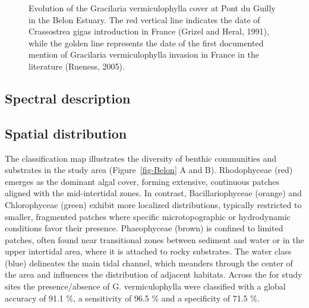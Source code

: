 \documentclass[
  letterpaper,
  DIV=11,
  numbers=noendperiod]{scrartcl}
\begin{document}
\label{cell-fig-HistoricalPlot}
\begin{figure}[H]


\caption{\label{fig-HistoricalPlot}Evolution of the Gracilaria
vermiculophylla cover at Pont du Guilly in the Belon Estuary. The red
vertical line indicates the date of Crassostrea gigas introduction in
France (Grizel and Heral, 1991), while the golden line represents the
date of the first documented mention of Gracilaria vermiculophylla
invasion in France in the literature (Rueness, 2005).}

\end{figure}%

\subsection{Spectral description}\label{spectral-description}

\subsection{Spatial distribution}\label{spatial-distribution}

The classification map illustrates the diversity of benthic communities
and substrates in the study area (Figure~\ref{fig-Belon} A and B).
Rhodophyceae (red) emerges as the dominant algal cover, forming
extensive, continuous patches aligned with the mid-intertidal zones. In
contrast, Bacillariophyceae (orange) and Chlorophyceae (green) exhibit
more localized distributions, typically restricted to smaller,
fragmented patches where specific microtopographic or hydrodynamic
conditions favor their presence. Phaeophyceae (brown) is confined to
limited patches, often found near transitional zones between sediment
and water or in the upper intertidal area, where it is attached to rocky
substrates. The water class (blue) delineates the main tidal channel,
which meanders through the center of the area and influences the
distribution of adjacent habitats. Across the for study sites the
presence/absence of G. vermiculophylla were classified with a global
accuracy of 91.1 \%, a sensitivity of 96.5 \% and a specificity of 71.5
\%.
\end{document}
